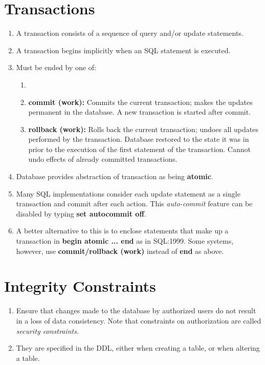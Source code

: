 \documentclass[journal,12pt,twocolumn]{IEEEtran}
\begin{document}
\section{Transactions}
\begin{enumerate}
    \item A transaction consists of a sequence of query and/or update statements.
    \item A transaction begins implicitly when an SQL statement is executed.
    \item Must be ended by one of:
    \begin{enumerate}
        \item 
        \item \textbf{commit (work):} Commits the current transaction; makes 
        the updates permanent in the database. A new transaction is started 
        after commit.
        \item \textbf{rollback (work):} Rolls back the current transaction; 
        undoes all updates performed by the transaction. Database restored to 
        the state it was in prior to the execution of the first statement of 
        the transaction. Cannot undo effects of already committed transactions.
    \end{enumerate}
    \item Database provides abstraction of transaction as being \textbf{atomic}.
    \item Many SQL implementations consider each update statement as a single 
    transaction and commit after each action. This \textit{auto-commit} feature 
    can be disabled by typing \textbf{set autocommit off}.
    \item A better alternative to this is to enclose statements that make up a 
    transaction in \textbf{begin atomic ... end} as in SQL:1999. Some systems, 
    however, use \textbf{commit/rollback (work)} instead of \textbf{end} as 
    above.
\end{enumerate}

\section{Integrity Constraints}
\begin{enumerate}
    \item Ensure that changes made to the database by authorized users do not 
    result in a loss of data consistency. Note that constraints on authorization 
    are called \textit{security constraints}.
    \item They are specified in the DDL, either when creating a table, or when 
    altering a table.
\end{enumerate}
\end{document}
